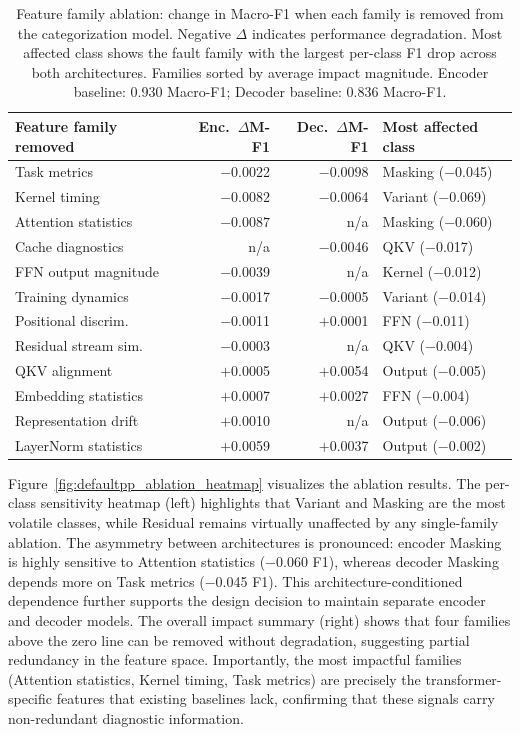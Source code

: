 \begin{table}[!ht]
\caption{Feature family ablation: change in Macro-F1 when each family is removed from the categorization model. Negative $\Delta$ indicates performance degradation. Most affected class shows the fault family with the largest per-class F1 drop across both architectures. Families sorted by average impact magnitude. Encoder baseline: 0.930 Macro-F1; Decoder baseline: 0.836 Macro-F1.}
\label{tab:defaultpp_ablation}
\centering
\footnotesize
\renewcommand{\arraystretch}{0.95}
\begin{tabular}{@{} l r r l @{}}
\toprule
\textbf{Feature family removed} & \textbf{Enc.\ $\Delta$M-F1} & \textbf{Dec.\ $\Delta$M-F1} & \textbf{Most affected class} \\
\midrule
Task metrics           & $-$0.0022 & $\mathbf{-0.0098}$ & Masking ($-$0.045) \\
Kernel timing          & $\mathbf{-0.0082}$ & $-$0.0064 & Variant ($-$0.069) \\
Attention statistics   & $\mathbf{-0.0087}$ & n/a       & Masking ($-$0.060) \\
Cache diagnostics      & n/a       & $-$0.0046 & QKV ($-$0.017) \\
FFN output magnitude   & $-$0.0039 & n/a       & Kernel ($-$0.012) \\
Training dynamics      & $-$0.0017 & $-$0.0005 & Variant ($-$0.014) \\
Positional discrim.    & $-$0.0011 & $+$0.0001 & FFN ($-$0.011) \\
Residual stream sim.   & $-$0.0003 & n/a       & QKV ($-$0.004) \\
\addlinespace
QKV alignment          & $+$0.0005 & $+$0.0054 & Output ($-$0.005) \\
Embedding statistics   & $+$0.0007 & $+$0.0027 & FFN ($-$0.004) \\
Representation drift   & $+$0.0010 & n/a       & Output ($-$0.006) \\
LayerNorm statistics   & $+$0.0059 & $+$0.0037 & Output ($-$0.002) \\
\bottomrule
\end{tabular}
\end{table}

Figure~\ref{fig:defaultpp_ablation_heatmap} visualizes the ablation results. The per-class sensitivity heatmap (left) highlights that Variant and Masking are the most volatile classes, while Residual remains virtually unaffected by any single-family ablation. The asymmetry between architectures is pronounced: encoder Masking is highly sensitive to Attention statistics ($-$0.060 F1), whereas decoder Masking depends more on Task metrics ($-$0.045 F1). This architecture-conditioned dependence further supports the design decision to maintain separate encoder and decoder models. The overall impact summary (right) shows that four families above the zero line can be removed without degradation, suggesting partial redundancy in the feature space. Importantly, the most impactful families (Attention statistics, Kernel timing, Task metrics) are precisely the transformer-specific features that existing baselines lack, confirming that these signals carry non-redundant diagnostic information.

